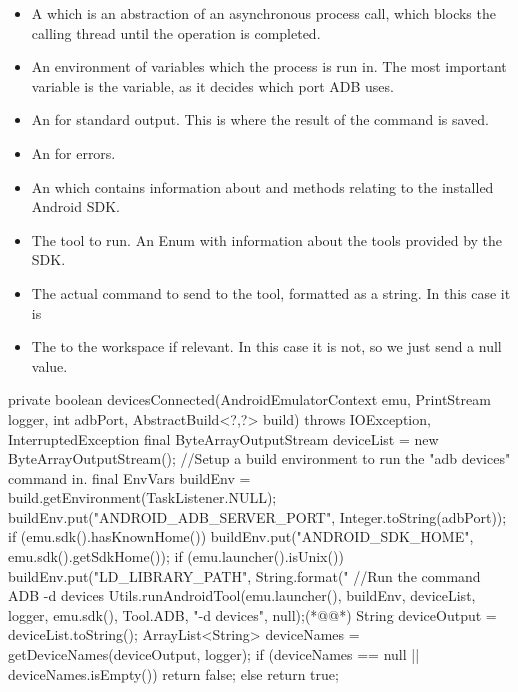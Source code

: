 \begin{itemize}
  \item A  which is an abstraction of an asynchronous process call, which blocks the calling thread until the operation is completed.
  \item An environment of variables which the process is run in. The most important variable is the  variable, as it decides which port ADB uses.
  \item An  for standard output. This is where the result of the command is saved.
  \item An  for errors.
  \item An  which contains information about and methods relating to the installed Android SDK.
  \item The tool to run. An Enum with information about the tools provided by the SDK.
  \item The actual command to send to the tool, formatted as a string. In this case it is 
  \item The  to the workspace if relevant. In this case it is not, so we just send a null value. 
\end{itemize}

\begin{javacode}[caption=The devicesConnected method which checks for connected devices.,label=lst:deviceCheck]
private boolean devicesConnected(AndroidEmulatorContext emu, PrintStream logger, int adbPort, AbstractBuild<?,?> build)
throws IOException, InterruptedException {
    final ByteArrayOutputStream deviceList = new ByteArrayOutputStream();
    //Setup a build environment to run the "adb devices" command in.
    final EnvVars buildEnv = build.getEnvironment(TaskListener.NULL);
    buildEnv.put("ANDROID_ADB_SERVER_PORT", Integer.toString(adbPort));
    if (emu.sdk().hasKnownHome()) {
        buildEnv.put("ANDROID_SDK_HOME", emu.sdk().getSdkHome());
    }
    if (emu.launcher().isUnix()) {
        buildEnv.put("LD_LIBRARY_PATH", String.format("%
    }
    //Run the command ADB -d devices
    Utils.runAndroidTool(emu.launcher(), buildEnv, deviceList, logger, emu.sdk(), Tool.ADB, "-d devices", null);(*@\label{line:runTool}@*)
    String deviceOutput = deviceList.toString();
    ArrayList<String> deviceNames = getDeviceNames(deviceOutput, logger);
    if (deviceNames == null || deviceNames.isEmpty()) {
        return false;
    }
    else {
        return true;
    }
}
\end{javacode}

